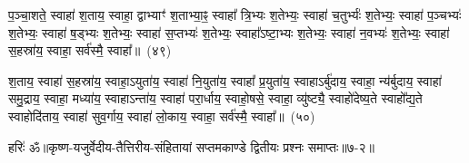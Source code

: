 {\anuvakamend[{वि॒ꣳ॒श॒त्यै द्वाद॑श}]}%

प॒ञ्चा॒शते॒ स्वाहा॑ श॒ताय॒ स्वाहा॒ द्वाभ्याꣳ॑ श॒ताभ्या॒ꣴ॒ स्वाहा᳚ त्रि॒भ्यः श॒तेभ्यः॒ स्वाहा॑ च॒तुर्भ्यः॑ श॒तेभ्यः॒ स्वाहा॑ प॒ञ्चभ्यः॑ श॒तेभ्यः॒ स्वाहा॑ ष॒ड्भ्यः श॒तेभ्यः॒ स्वाहा॑ स॒प्तभ्यः॑ श॒तेभ्यः॒ स्वाहा᳚\-ऽष्टा॒भ्यः श॒तेभ्यः॒ स्वाहा॑ न॒वभ्यः॑ श॒तेभ्यः॒ स्वाहा॑ स॒हस्रा॑य॒ स्वाहा॒ सर्व॑स्मै॒ स्वाहा᳚॥~(४९)\ip

{\anuvakamend[{प॒ञ्चा॒शते॒ द्वात्रिꣳ॑शत्}]}%

श॒ताय॒ स्वाहा॑ स॒हस्रा॑य॒ स्वाहा॒\-ऽयुता॑य॒ स्वाहा॑ नि॒युता॑य॒ स्वाहा᳚ प्र॒युता॑य॒ स्वाहा\-ऽर्बु॑दाय॒ स्वाहा॒ न्य॑र्बुदाय॒ स्वाहा॑ समु॒द्राय॒ स्वाहा॒ मध्या॑य॒ स्वाहा\-ऽन्ता॑य॒ स्वाहा॑ परा॒र्धाय॒ स्वाहो॒षसे॒ स्वाहा॒ व्यु॑ष्ट्यै॒ स्वाहो॑देष्य॒ते स्वाहो᳚द्य॒ते स्वाहोदि॑ताय॒ स्वाहा॑ सुव॒र्गाय॒ स्वाहा॑ लो॒काय॒ स्वाहा॒ सर्व॑स्मै॒ स्वाहा᳚॥~(५०)\ip

{\anuvakamend[{श॒ताया॒ष्टात्रिꣳ॑शत्}]}%


{हरिः॑ ॐ}{॥कृष्ण-यजुर्वेदीय-तैत्तिरीय-संहितायां सप्तमकाण्डे द्वितीयः प्रश्नः समाप्तः॥७-२॥}


